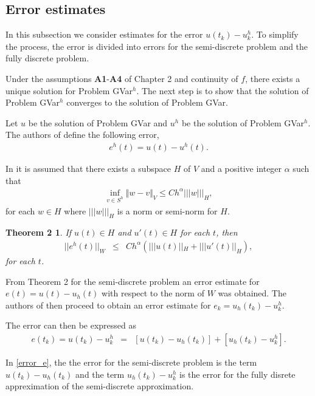 \documentclass[../../main.tex]{subfiles}
\begin{document}
\subsection{Error estimates}\label{e_est}
In this subsection we consider estimates for the error $u(t_k) - u^h_k$. To simplify the process, the error is divided into errors for the semi-discrete problem and the fully discrete problem.

Under the assumptions \textbf{A1}-\textbf{A4} of Chapter 2 and continuity of $f$, there exists a unique solution for Problem GVar$^h$. The next step is to show that the solution of Problem GVar$^h$ converges to the solution of Problem GVar.

Let $u$ be the solution of Problem GVar and $u^h$ be the solution of Problem GVar$^h$. The authors of \cite{BV13} define the following error,
\begin{eqnarray}
	e^h(t) = u(t) - u^h(t). \label{Error}
\end{eqnarray}

In \cite{BV13} it is assumed that there exists a subspace $H$ of $V$ and a positive integer $\alpha$ such that
\begin{eqnarray*}
	\inf_{v\in S^{h}}\Vert w-v\Vert_{V}\leq{C}h^{\alpha}|||w|||_{H},
\end{eqnarray*} for each $w \in H$ where $|||w|||_H$ is a norm or semi-norm for $H$.

\newtheorem*{DC_Thm6_1}{Theorem 2}
\begin{DC_Thm6_1}
	If $u(t) \in H$ and $u'(t) \in H$ for each $t$, then
	\begin{eqnarray*}
		||e^h(t)||_W & \leq & C h^\alpha \left( |||u(t)||_H + |||u'(t)||_H \right),
	\end{eqnarray*} for each $t$.
\end{DC_Thm6_1}

From Theorem 2 for the semi-discrete problem an error estimate for
$e(t) = u(t)-u_h(t)$ with respect to the norm of $W$ was obtained. The authors of \cite{BV13} then proceed to obtain an error estimate for $e_k = u_h(t_k) - u^h_k$. 

The error can then be expressed as
\begin{eqnarray}
	e(t_k) = u(t_k) - u^h_k & = & [u(t_k)-u_h(t_k)] + [u_h(t_k) - u^h_k]. \label{error_e}
\end{eqnarray}

In \eqref{error_e}, the the error for the semi-discrete problem is the term $u(t_k)-u_h(t_k)$ and the term $u_h(t_k) - u^h_k$ is the error for the fully disrete appreximation of the semi-discrete approximation.
\end{document}
